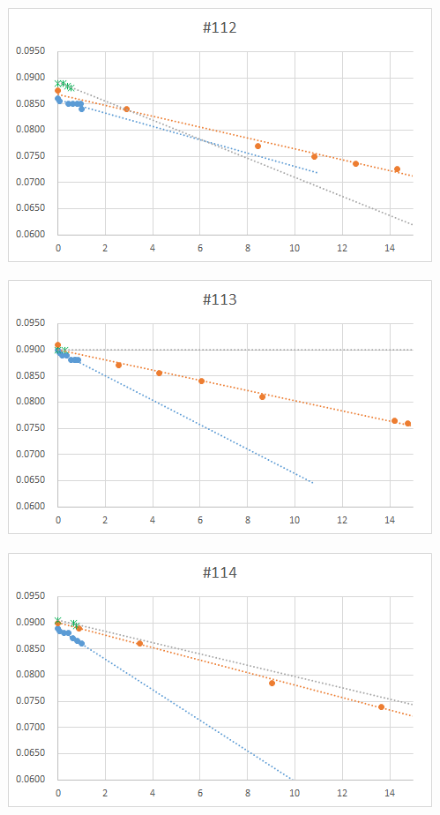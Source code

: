   \begin{figure}[htbp]
    \centering
       \includegraphics[width=120mm]{vol_112.png}
  \end{figure}
  \begin{figure}[htbp]
    \centering
       \includegraphics[width=120mm]{vol_113.png}
  \end{figure}
  \begin{figure}[htbp]
    \centering
       \includegraphics[width=120mm]{vol_114.png}
  \end{figure}
